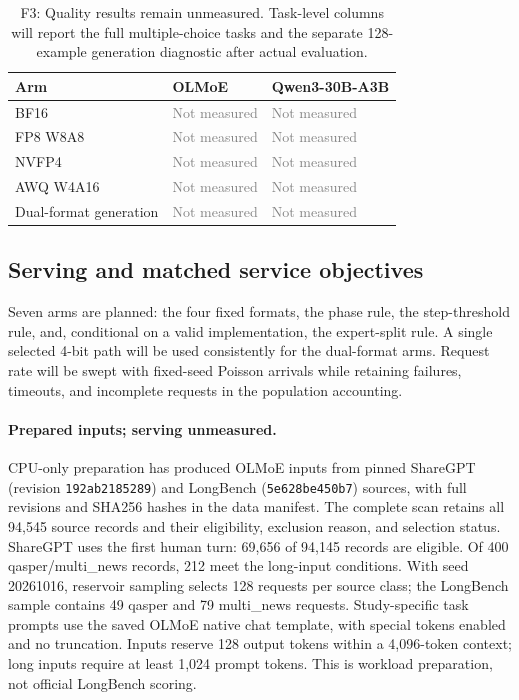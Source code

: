 \documentclass[10pt,twocolumn]{article}
\newcommand{\pending}{\textcolor{gray}{Not measured}}
\begin{document}
\begin{table}[t]
\centering\small
\caption{F3: Quality results remain unmeasured. Task-level columns will
report the full multiple-choice tasks and the separate 128-example
generation diagnostic after actual evaluation.}
\label{tab:quality}
\begin{tabularx}{\linewidth}{@{}lYY@{}}
\toprule
Arm & OLMoE & Qwen3-30B-A3B\\
\midrule
BF16 & \pending & \pending\\
FP8 W8A8 & \pending & \pending\\
NVFP4 & \pending & \pending\\
AWQ W4A16 & \pending & \pending\\
Dual-format generation & \pending & \pending\\
\bottomrule
\end{tabularx}
\end{table}

\subsection{Serving and matched service objectives}
Seven arms are planned: the four fixed formats, the phase rule, the
step-threshold rule, and, conditional on a valid implementation, the
expert-split rule. A single selected 4-bit path will be used consistently
for the dual-format arms. Request rate will be swept with fixed-seed Poisson
arrivals while retaining failures, timeouts, and incomplete requests in the
population accounting.

\paragraph{Prepared inputs; serving unmeasured.}
CPU-only preparation has produced OLMoE inputs from pinned ShareGPT
(revision \texttt{192ab2185289}) and LongBench
(\texttt{5e628be450b7}) sources, with full revisions and SHA256 hashes in the
data manifest. The complete scan retains all 94,545 source records and
their eligibility, exclusion reason, and selection status. ShareGPT uses
the first human turn: 69,656 of 94,145 records are eligible. Of 400
qasper/multi\_news records, 212 meet the long-input conditions. With seed
20261016, reservoir sampling selects 128 requests per source class;
the LongBench sample contains 49 qasper and 79 multi\_news requests.
Study-specific task prompts use the saved OLMoE native chat template,
with special tokens enabled and no truncation. Inputs reserve 128 output
tokens within a 4,096-token context; long inputs require at least 1,024
prompt tokens. This is workload preparation, not official LongBench scoring.
\end{document}
